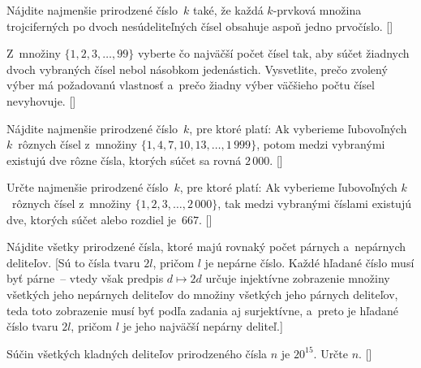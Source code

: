 {Nájdite najmenšie prirodzené číslo~$k$ také, že každá $k$-prvková
množina trojciferných po dvoch nesúdeliteľných čísel obsahuje aspoň
jedno prvočíslo. []

Z~množiny $\{1,2,3,\dots,99\}$ vyberte čo najväčší počet
čísel tak, aby súčet žiadnych dvoch vybraných čísel nebol násobkom
jedenástich. Vysvetlite, prečo
zvolený výber má požadovanú vlastnosť a~prečo žiadny
výber väčšieho počtu čísel nevyhovuje. []

Nájdite najmenšie prirodzené číslo~$k$, pre ktoré platí:
Ak vyberieme ľubovoľných $k$~rôznych čísel z~množiny
$\{1, 4, 7, 10, 13,\dots, 1\,999\}$, potom medzi vybranými existujú
dve rôzne čísla, ktorých súčet sa rovná $2\,000$. []

Určte najmenšie prirodzené číslo~$k$, pre ktoré platí: Ak vyberieme
ľubovoľných $k$~rôznych čísel z~množiny $\{1,2,3,\dots,2\,000\}$,
tak medzi vybranými číslami existujú dve, ktorých súčet alebo rozdiel
je~$667$. []

Nájdite všetky prirodzené čísla, ktoré majú rovnaký počet párnych
a~nepárnych deliteľov. [Sú to čísla tvaru $2l$, pričom $l$ je nepárne číslo.
Každé hľadané číslo musí byť párne~-- vtedy však predpis $d\mapsto 2d$ určuje injektívne zobrazenie
množiny všetkých jeho nepárnych deliteľov do množiny všetkých jeho párnych
deliteľov, teda toto zobrazenie musí byť podľa zadania aj surjektívne,
a~preto je hľadané číslo tvaru $2l$, pričom $l$ je jeho najväčší nepárny
deliteľ.]

Súčin všetkých kladných deliteľov prirodzeného čísla $n$ je $20^{15}$. Určte $n$. []
}

